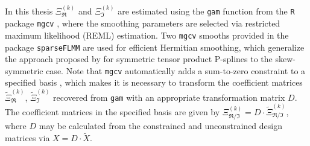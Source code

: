 In this thesis  $\Xi^{(k)}_\Re$ and $\Xi^{(k)}_\Im$ are estimated using the \texttt{gam} function from the \texttt{R} package \texttt{mgcv} \parencite{Wood2017}, where the smoothing parameters are selected via restricted maximum likelihood (REML) estimation.
Two \texttt{mgcv} smooths provided in the package \texttt{sparseFLMM} \parencite{sparseFLMM} are used for efficient Hermitian smoothing, which generalize the approach proposed by \cite{CederbaumScheiplGreven2018} for symmetric tensor product P-splines to the skew-symmetric case.
Note that \texttt{mgcv} automatically adds a sum-to-zero constraint to a specified basis \parencite[see][175]{Wood2017}, which makes it is necessary to transform the coefficient matrices $\widetilde \Xi_\Re^{(k)}$, $\widetilde \Xi_\Im^{(k)}$ recovered from \texttt{gam} with an appropriate transformation matrix $D$.
The coefficient matrices in the specified basis are given by $\Xi_{\Re/\Im}^{(k)} = D \cdot \widetilde \Xi_ {\Re/\Im}^{(k)}$, where $D$ may be calculated from the constrained and unconstrained design matrices via $X = D \cdot \widetilde X$.

